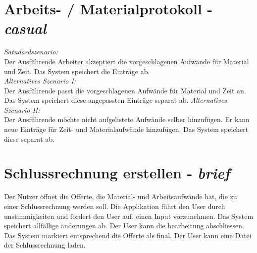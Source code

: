 \documentclass[journal]{combine}
\begin{document}
	\newpage
	\section{Arbeits- / Materialprotokoll  - \emph{casual}}
		\emph{Satndardszenario:} \\
		Der Ausführende Arbeiter akzeptiert die vorgeschlagenen Aufwände für Material
		und Zeit. Das System speichert die Einträge ab.\\
		\emph{Alternatives Szenario I:}\\
		Der Ausführende passt die vorgeschlagenen Aufwände für Material und Zeit an.
		Das System speichert diese angepassten Einträge separat ab.
		\emph{Alternatives Szenario II:}\\
		Der Ausführende möchte nicht aufgelistete Aufwände selber hinzufügen. Er kann neue
		Einträge für Zeit- und Materialaufwände hinzufügen. Das System speichert diese separat ab.
	\newpage
	\section{Schlussrechnung erstellen - \emph{brief}}
		Der Nutzer öffnet die Offerte, die Material- und Arbeitsaufwände hat,
		die zu einer Schlussrechnung werden soll. Die Applikation führt den User durch
		unstimmigkeiten und fordert den User auf, einen Input vorzunehmen. Das System
		speichert allfällige änderungen ab. Der User kann die bearbeitung abschliessen.
		Das System markiert entsprechend die Offerte als final. Der User kann eine Datei der 
		Schlussrechnung laden.
\end{document}
